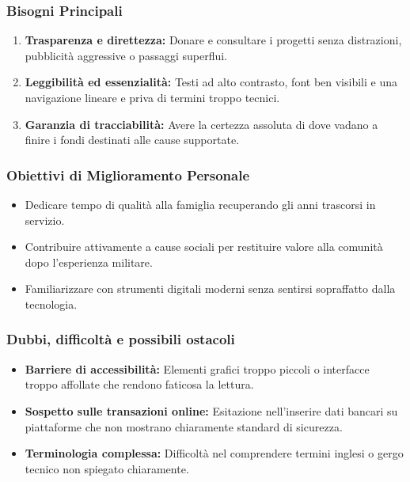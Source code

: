 \documentclass[11pt,a4paper]{article}
\begin{document}
\subsubsection{Bisogni Principali}
\begin{enumerate}
    \item \textbf{Trasparenza e direttezza:} Donare e consultare i progetti senza distrazioni, pubblicità aggressive o passaggi superflui.
    \item \textbf{Leggibilità ed essenzialità:} Testi ad alto contrasto, font ben visibili e una navigazione lineare e priva di termini troppo tecnici.
    \item \textbf{Garanzia di tracciabilità:} Avere la certezza assoluta di dove vadano a finire i fondi destinati alle cause supportate.
\end{enumerate}

\subsubsection{Obiettivi di Miglioramento Personale}
\begin{itemize}
    \item Dedicare tempo di qualità alla famiglia recuperando gli anni trascorsi in servizio.
    \item Contribuire attivamente a cause sociali per restituire valore alla comunità dopo l'esperienza militare.
    \item Familiarizzare con strumenti digitali moderni senza sentirsi sopraffatto dalla tecnologia.
\end{itemize}

\subsubsection{Dubbi, difficoltà e possibili ostacoli}
\begin{itemize}
    \item \textbf{Barriere di accessibilità:} Elementi grafici troppo piccoli o interfacce troppo affollate che rendono faticosa la lettura.
    \item \textbf{Sospetto sulle transazioni online:} Esitazione nell'inserire dati bancari su piattaforme che non mostrano chiaramente standard di sicurezza.
    \item \textbf{Terminologia complessa:} Difficoltà nel comprendere termini inglesi o gergo tecnico non spiegato chiaramente.
\end{itemize}
\end{document}

